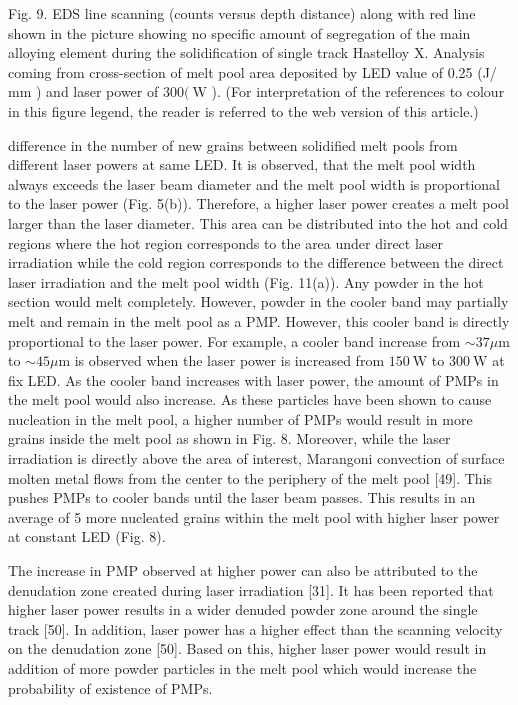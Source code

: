 \documentclass[10pt]{article}
\begin{document}
Fig. 9. EDS line scanning (counts versus depth distance) along with red line shown in the picture showing no specific amount of segregation of the main alloying element during the solidification of single track Hastelloy X. Analysis coming from cross-section of melt pool area deposited by LED value of 0.25 (J/ $\mathrm{mm}$ ) and laser power of $300(\mathrm{~W}$ ). (For interpretation of the references to colour in this figure legend, the reader is referred to the web version of this article.)

difference in the number of new grains between solidified melt pools from different laser powers at same LED. It is observed, that the melt pool width always exceeds the laser beam diameter and the melt pool width is proportional to the laser power (Fig. 5(b)). Therefore, a higher laser power creates a melt pool larger than the laser diameter. This area can be distributed into the hot and cold regions where the hot region corresponds to the area under direct laser irradiation while the cold region corresponds to the difference between the direct laser irradiation and the melt pool width (Fig. 11(a)). Any powder in the hot section would melt completely. However, powder in the cooler band may partially melt and remain in the melt pool as a PMP. However, this cooler band is directly proportional to the laser power. For example, a cooler band increase from $\sim 37 \mu \mathrm{m}$ to $\sim 45 \mu \mathrm{m}$ is observed when the laser power is increased from $150 \mathrm{~W}$ to $300 \mathrm{~W}$ at fix LED. As the cooler band increases with laser power, the amount of PMPs in the melt pool would also increase. As these particles have been shown to cause nucleation in the melt pool, a higher number of PMPs would result in more grains inside the melt pool as shown in Fig. 8. Moreover, while the laser irradiation is directly above the area of interest, Marangoni convection of surface molten metal flows from the center to the periphery of the melt pool [49]. This pushes PMPs to cooler bands until the laser beam passes. This results in an average of 5 more nucleated grains within the melt pool with higher laser power at constant LED (Fig. 8).

The increase in PMP observed at higher power can also be attributed to the denudation zone created during laser irradiation [31]. It has been reported that higher laser power results in a wider denuded powder zone around the single track [50]. In addition, laser power has a higher effect than the scanning velocity on the denudation zone [50]. Based on this, higher laser power would result in addition of more powder particles in the melt pool which would increase the probability of existence of PMPs.
\end{document}
